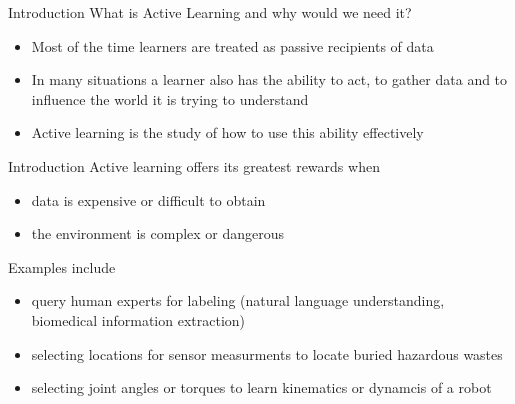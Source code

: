 \documentclass{beamer}
\begin{document}
\begin{frame}{Introduction}
What is Active Learning and why would we need it?
\begin{itemize}
  \item Most of the time learners are treated as passive recipients of data
  \item In many situations a learner also has the ability to act, to gather data
    and to influence the world it is trying to understand
  \item Active learning is the study of how to use this ability effectively
\end{itemize}

\begin{center}\end{center}
\end{frame}

\begin{frame}{Introduction}
Active learning offers its greatest rewards when
\begin{itemize}
  \item data is expensive or difficult to obtain
  \item the environment is complex or dangerous
\end{itemize}
Examples include
\begin{itemize}
  \item query human experts for labeling (natural language understanding,
    biomedical information extraction)
  \item selecting locations for sensor measurments to locate buried hazardous wastes
  \item selecting joint angles or torques to learn kinematics or dynamcis of a robot
\end{itemize}
\end{frame}
\end{document}
